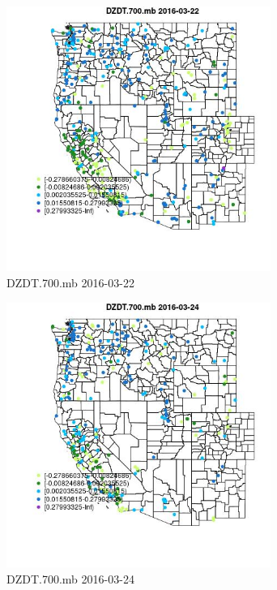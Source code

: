 \begin{figure} 
\centering  
\includegraphics[width=0.77\textwidth]{Code_Outputs/Report_ML_input_PM25_Step4_part_e_de_duplicated_aveswNAs_MapObsDZDT700mb2016-03-22.jpg} 
\caption{\label{fig:Report_ML_input_PM25_Step4_part_e_de_duplicated_aveswNAsMapObsDZDT700mb2016-03-22}DZDT.700.mb 2016-03-22} 
\end{figure} 
 

\begin{figure} 
\centering  
\includegraphics[width=0.77\textwidth]{Code_Outputs/Report_ML_input_PM25_Step4_part_e_de_duplicated_aveswNAs_MapObsDZDT700mb2016-03-24.jpg} 
\caption{\label{fig:Report_ML_input_PM25_Step4_part_e_de_duplicated_aveswNAsMapObsDZDT700mb2016-03-24}DZDT.700.mb 2016-03-24} 
\end{figure} 
 

